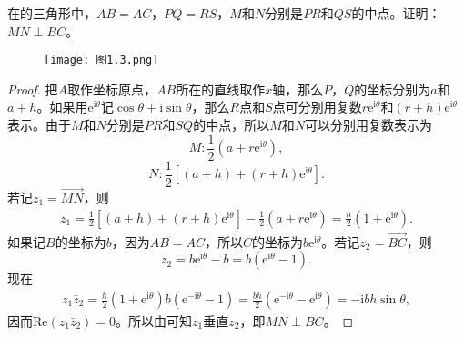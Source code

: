 \documentclass[../../main.tex]{subfiles}
\begin{document}
\begin{example}
在的三角形中，\(AB = AC\)，\(PQ = RS\)，\(M\)和\(N\)分别是\(PR\)和\(QS\)的中点。证明：\(MN \perp BC\)。
\begin{figure}[H]
\centering
\texttt{[image: 图1.3.png]}
\caption{}
\label{figure:图1.3}
\end{figure}
\end{example}
\begin{proof}
把\(A\)取作坐标原点，\(AB\)所在的直线取作\(x\)轴，那么\(P\)，\(Q\)的坐标分别为\(a\)和\(a + h\)。如果用\(\mathrm{e}^{\mathrm{i}\theta}\)记\(\cos\theta + \mathrm{i}\sin\theta\)，那么\(R\)点和\(S\)点可分别用复数\(r\mathrm{e}^{\mathrm{i}\theta}\)和\((r + h)\mathrm{e}^{\mathrm{i}\theta}\)表示。由于\(M\)和\(N\)分别是\(PR\)和\(SQ\)的中点，所以\(M\)和\(N\)可以分别用复数表示为
\[
M: \frac{1}{2}(a + r\mathrm{e}^{\mathrm{i}\theta}),
\]
\[
N: \frac{1}{2}[(a + h) + (r + h)\mathrm{e}^{\mathrm{i}\theta}].
\]
若记\(z_1 = \overrightarrow{MN}\)，则
\[
\begin{split}
z_1 = \frac{1}{2}[(a + h) + (r + h)\mathrm{e}^{\mathrm{i}\theta}] - \frac{1}{2}(a + r\mathrm{e}^{\mathrm{i}\theta}) = \frac{h}{2}(1 + \mathrm{e}^{\mathrm{i}\theta}).
\end{split}
\]
如果记\(B\)的坐标为\(b\)，因为\(AB = AC\)，所以\(C\)的坐标为\(b\mathrm{e}^{\mathrm{i}\theta}\)。若记\(z_2 = \overrightarrow{BC}\)，则
\[
z_2 = b\mathrm{e}^{\mathrm{i}\theta} - b = b(\mathrm{e}^{\mathrm{i}\theta} - 1).
\]
现在
\[
\begin{split}
z_1\bar{z}_2 = \frac{h}{2}(1 + \mathrm{e}^{\mathrm{i}\theta})b(\mathrm{e}^{-\mathrm{i}\theta} - 1) = \frac{bh}{2}(\mathrm{e}^{-\mathrm{i}\theta} - \mathrm{e}^{\mathrm{i}\theta}) = -\mathrm{i}bh\sin\theta,
\end{split}
\]
因而\(\mathrm{Re}(z_1\bar{z}_2) = 0\)。所以由可知\(z_1\)垂直\(z_2\)，即\(MN \perp BC\)。 
\end{proof}
\end{document}
